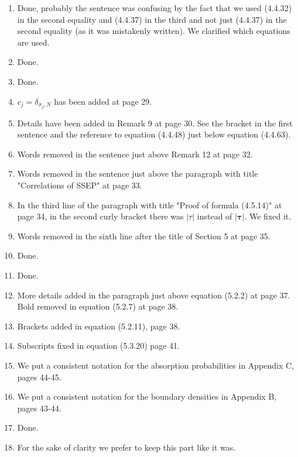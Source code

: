 \documentclass[10pt]{article}
\numberwithin{equation}{section}
\numberwithin{equation}{subsection}
\begin{document}
\begin{enumerate}
			\item Done, probably the sentence was confusing by the fact that we used (4.4.32) in the second equality and (4.4.37) in the third and not just (4.4.37) in the second equality (as it was mistakenly written). We clarified which equations are used. 
			\item Done.
			\item Done.
			\item $c_{j}=\delta_{\sigma_{j},N}$ has been added at page 29.
			\item Details have been added in Remark 9 at page 30. See the bracket in the first sentence and the reference to equation (4.4.48) just below equation (4.4.63).
			\item Words removed in the sentence just above Remark 12 at page 32. 
			\item Words removed in the sentence just above the paragraph with title "Correlations of SSEP" at page 33.
			\item In the third line of the paragraph with title "Proof of formula (4.5.14)" at page 34, in the second curly bracket there was $|\tau|$ instead of $|\bm{\tau}|$. We fixed it.
			\item Words removed in the sixth line after the title of Section 5 at page 35. 
			\item Done.
			\item Done.
			\item More details added in the paragraph just above equation (5.2.2) at page 37. Bold removed in equation (5.2.7) at page 38.
			\item Brackets added in equation (5.2.11), page 38.
			\item Subscripts fixed in equation (5.3.20) page 41.
			\item We put a consistent notation for the absorption probabilities in Appendix C, pages 44-45. 
			\item We put a consistent notation for the boundary densities in Appendix B, pages 43-44.
			\item Done.
			\item For the sake of clarity we prefer to keep this part like it was.
		\end{enumerate}
\end{document}
